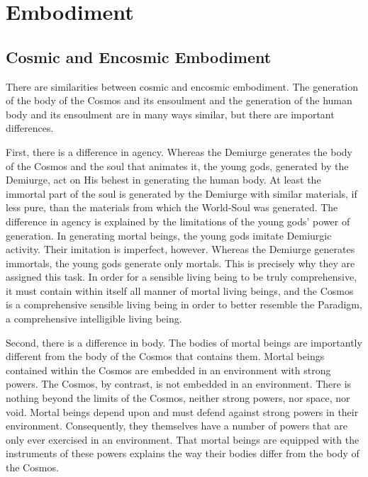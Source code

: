 \chapter{Embodiment} %
\label{cha:incarnation}

\section{Cosmic and Encosmic Embodiment} %
\label{sec:cosmic_and_encosmic_incarnation}

There are similarities between cosmic and encosmic embodiment. The generation of the body of the Cosmos and its ensoulment and the generation of the human body and its ensoulment are in many ways similar, but there are important differences. 

First, there is a difference in agency. Whereas the Demiurge generates the body of the Cosmos and the soul that animates it, the young gods, generated by the Demiurge, act on His behest in generating the human body. At least the immortal part of the soul is generated by the Demiurge with similar materials, if less pure, than the materials from which the World-Soul was generated. The difference in agency is explained by the limitations of the young gods' power of generation. In generating mortal beings, the young gods imitate Demiurgic activity. Their imitation is imperfect, however. Whereas the Demiurge generates immortals, the young gods generate only mortals. This is precisely why they are assigned this task. In order for a sensible living being to be truly comprehensive, it must contain within itself all manner of mortal living beings, and the Cosmos is a comprehensive sensible living being in order to better resemble the Paradigm, a comprehensive intelligible living being. 

Second, there is a difference in body. The bodies of mortal beings are importantly different from the body of the Cosmos that contains them. Mortal beings contained within the Cosmos are embedded in an environment with strong powers. The Cosmos, by contrast, is not embedded in an environment. There is nothing beyond the limits of the Cosmos, neither strong powers, nor space, nor void. Mortal beings depend upon and must defend against strong powers in their environment. Consequently, they themselves have a number of powers that are only ever exercised in an environment. That mortal beings are equipped with the instruments of these powers explains the way their bodies differ from the body of the Cosmos. 

